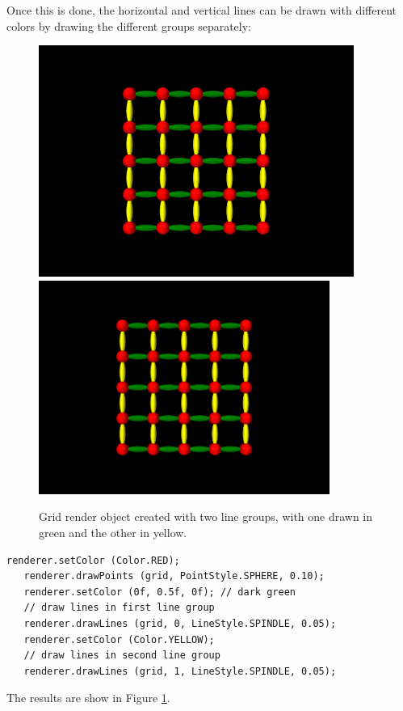 %
Once this is done, the horizontal and vertical lines can be drawn with
different colors by drawing the different groups separately:
%
\begin{figure}[t]
\begin{center}
\iflatexml
 \includegraphics[]{images/gridHighlighted}
\else
 \includegraphics[width=3.75in]{images/gridHighlighted}
\fi
\end{center}
\caption{Grid render object created with two line groups, with
one drawn in green and the other in yellow.}
\label{gridHighlighted:fig}
\end{figure}
%
\begin{lstlisting}[]
   renderer.setColor (Color.RED);
   renderer.drawPoints (grid, PointStyle.SPHERE, 0.10);
   renderer.setColor (0f, 0.5f, 0f); // dark green
   // draw lines in first line group
   renderer.drawLines (grid, 0, LineStyle.SPINDLE, 0.05);
   renderer.setColor (Color.YELLOW);
   // draw lines in second line group
   renderer.drawLines (grid, 1, LineStyle.SPINDLE, 0.05);
\end{lstlisting}
%
The results are show in Figure \ref{gridHighlighted:fig}.

